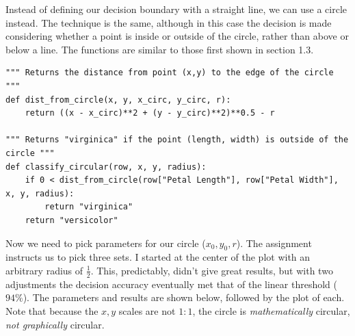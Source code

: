 \documentclass[letterpaper]{article}
\begin{document}
Instead of defining our decision boundary with a straight line, we can use
a circle instead. The technique is the same, although in this case the decision
is made considering whether a point is inside or outside of the circle, rather
than above or below a line. The functions are similar to those first shown in
section 1.3.
\begin{verbatim}
""" Returns the distance from point (x,y) to the edge of the circle """
def dist_from_circle(x, y, x_circ, y_circ, r):
    return ((x - x_circ)**2 + (y - y_circ)**2)**0.5 - r

""" Returns "virginica" if the point (length, width) is outside of the circle """
def classify_circular(row, x, y, radius):
    if 0 < dist_from_circle(row["Petal Length"], row["Petal Width"], x, y, radius):
        return "virginica"
    return "versicolor"
\end{verbatim}
Now we need to pick parameters for our circle ($x_{0}, y_{0}, r$). The
assignment instructs us to pick three sets. I started at the center of the plot
with an arbitrary radius of $\frac{1}{2}$. This, predictably, didn't give great
results, but with two adjustments the decision accuracy eventually met that of
the linear threshold ($94\%$). The parameters and results are shown below,
followed by the plot of each. Note that because the $x,y$ scales are not $1:1$,
the circle is \textit{mathematically} circular, \textit{not graphically} circular.
\end{document}
